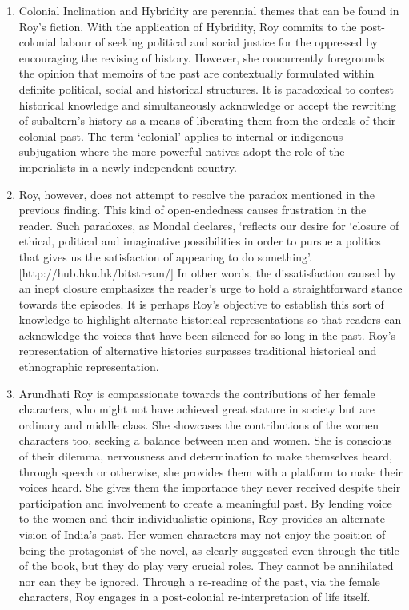 \begin{enumerate}
  \item 	Colonial Inclination and Hybridity are perennial themes that can be found in Roy’s fiction. With the application of Hybridity, Roy commits to the post-colonial labour of seeking political and social justice for the oppressed by encouraging the revising of history. However, she concurrently foregrounds the opinion that memoirs of the past are contextually formulated within definite political, social and historical structures. It is paradoxical to contest historical knowledge and simultaneously acknowledge or accept the rewriting of subaltern’s history as a means of liberating them from the ordeals of their colonial past. The term ‘colonial’ applies to internal or indigenous subjugation where the more powerful natives adopt the role of the imperialists in a newly independent country.


  \item Roy, however, does not attempt to resolve the paradox mentioned in the previous finding. This kind of open-endedness causes frustration in the reader. Such paradoxes, as Mondal declares, ‘reflects our desire for ‘closure of ethical, political and imaginative possibilities in order to pursue a politics that gives us the satisfaction of appearing to do something’. [http://hub.hku.hk/bitstream/] In other words, the dissatisfaction caused by an inept closure emphasizes the reader’s urge to hold a straightforward stance towards the episodes. It is perhaps Roy’s objective to establish this sort of knowledge to highlight alternate historical representations so that readers can acknowledge the voices that have been silenced for so long in the past. Roy’s representation of alternative histories surpasses traditional historical and ethnographic representation.

  \item Arundhati Roy is compassionate towards the contributions of her female characters, who might not have achieved great stature in society but are ordinary and middle class. She showcases the contributions of the women characters too, seeking a balance between men and women. She is conscious of their dilemma, nervousness and determination to make themselves heard, through speech or otherwise, she provides them with a platform to make their voices heard. She gives them the importance they never received despite their participation and involvement to create a meaningful past. By lending voice to the women and their individualistic opinions, Roy provides an alternate vision of India’s past. Her women characters may not enjoy the position of being the protagonist of the novel, as clearly suggested even through the title of the book, but they do play very crucial roles. They cannot be annihilated nor can they be ignored. Through a re-reading of the past, via the female characters, Roy engages in a post-colonial re-interpretation of life itself. 


\end{enumerate}
